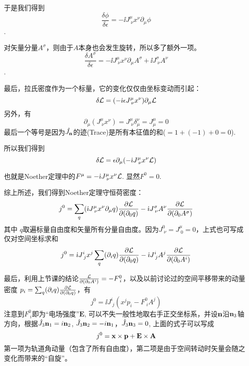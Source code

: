 \documentclass[CJK]{beamer}
\begin{document}
\begin{frame}
\bch
于是我们得到
$$\frac{\delta \phi}{\delta\epsilon} = -\ii  J^\mu_{\;\nu} x^\nu \partial_\mu \phi$$.

\skipline
对矢量分量$A^\sigma$，则由于$A$本身也会发生旋转，所以多了额外一项。
$$\frac{\delta A^\sigma}{\delta\epsilon} = -\ii  J^\mu_{\;\nu} x^\nu\partial_\mu A^\sigma + \ii J^\sigma_{\;\nu}A^\nu$$.

\ech
\end{frame}

\begin{frame}
\bch
最后，拉氏密度作为一个标量，它的变化仅仅由坐标变动而引起：
$$ \delta {\mathcal{L}} = (-{\dot{\imath}} \epsilon J^\mu_{\;\nu} x^\nu)\partial_\mu {\mathcal{L}} $$
另外，有
$$\partial_\mu(J^\mu_{\;\nu} x^\nu) = J^\mu_{\;\nu} \delta^\nu_\mu = J^\mu_\mu = 0 $$
最后一个等号是因为${\hat{J_{\mathbf{n}}}}$的迹(Trace)是所有本征值的和($=1+(-1)+0 = 0$).

所以我们得到
$$\delta {\mathcal{L}} = \epsilon \partial_\mu (-{\dot{\imath}}  J^\mu_{\;\nu} x^\nu {\mathcal{L}}) $$

也就是Noether定理中的$F^\mu = -{\dot{\imath}}  J^\mu_{\;\nu} x^\nu {\mathcal{L}}$. 显然$F^0 = 0$.
\ech
\end{frame}

\begin{frame}
\bch
综上所述，我们得到Noether定理守恒荷密度：
$$j^0 =   \sum_q({\dot{\imath}}  J^\mu_{\;\nu} x^\nu \partial_\mu q) \frac{\partial {\mathcal{L}}}{\partial(\partial_0 q)} - {\dot{\imath}} J^\sigma_{\;\nu}A^\nu \frac{\partial {\mathcal{L}}}{\partial(\partial_0 A^\sigma)}$$
其中 $q$取遍标量自由度和矢量所有分量自由度。因为$J^0_{\;\nu} = J^\mu_{\;0} = 0$，上式也可写成仅对空间坐标求和
$$j^0 =  {\dot{\imath}}  J^i_{\;j} x^j \sum_q(\partial_i q )\frac{\partial {\mathcal{L}}}{\partial(\partial_0 q)} - {\dot{\imath}} J^i_{\;j}A^j \frac{\partial {\mathcal{L}}}{\partial(\partial_0 A^i)}$$
\ech
\end{frame}

\begin{frame}
\bch
最后，利用上节课的结论$\frac{{\mathcal{L}}}{\partial(\partial_0 A^i)} = - F^0_{\; i}$，以及以前讨论过的空间平移带来的动量密度
$p_i = \sum_q(\partial_i q )\frac{\partial {\mathcal{L}}}{\partial(\partial_0 q)} $，有
$$j^0 =  \ii  J^i_{\;j} (x^j p_i - F^0_{\;i} A^j)$$
注意到$F^0_{\;i}$即为“电场强度”$\mathbf{E}$, 可以不失一般性地取右手正交坐标系，并设${\mathbf{n}}$沿${\mathbf{n}}_3$轴方向，根据$\hat{J_{3}}{\mathbf{n}}_1 = i {\mathbf{n}}_2$, $\hat{J_{3}}{\mathbf{n}}_2 = - i{\mathbf{n}}_1$，$\hat{J_{3}}{\mathbf{n}}_3 = 0$, 上面的式子可以写成
$$j^0 = {\mathbf{x}} \times {\mathbf{p}} + \mathbf{E} \times \mathbf{A}$$
第一项为轨道角动量（包含了所有自由度），第二项是由于空间转动时矢量会随之变化而带来的“自旋”。
\ech
\end{frame}
\end{document}
